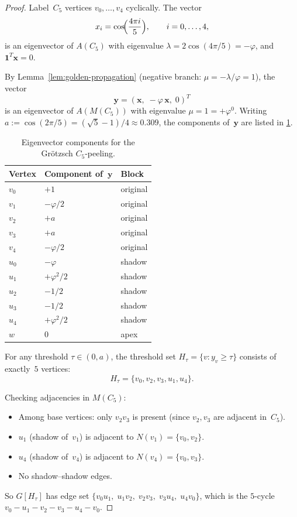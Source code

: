 \documentclass[11pt,a4paper]{amsart}
\theoremstyle{plain}
\theoremstyle{definition}
\theoremstyle{remark}
\newcommand{\vp}{\varphi}
\begin{document}
\begin{proof}
Label~$C_5$ vertices $v_0,\ldots,v_4$ cyclically.  The vector
\[
  x_i = \cos\!\Bigl(\frac{4\pi i}{5}\Bigr),
  \qquad i = 0,\ldots,4,
\]
is an eigenvector of $A(C_5)$ with eigenvalue
$\lambda = 2\cos(4\pi/5) = -\vp$, and $\mathbf{1}^T\mathbf{x} = 0$.

By Lemma~\ref{lem:golden-propagation} (negative branch:
$\mu = -\lambda/\vp = 1$), the vector
\[
  \mathbf{y} = (\mathbf{x},\;-\vp\,\mathbf{x},\;0)^T
\]
is an eigenvector of $A(M(C_5))$ with eigenvalue $\mu = 1 = +\vp^0$.
Writing $a := \cos(2\pi/5) = (\sqrt{5}-1)/4 \approx 0.309$, the components
of~$\mathbf{y}$ are listed in \cref{tab:grotzsch-eig}.

\begin{table}[ht]
\centering
\caption{Eigenvector components for the Gr\"otzsch $C_5$-peeling.}
\label{tab:grotzsch-eig}
\begin{tabular}{lll}
\toprule
Vertex & Component of~$\mathbf{y}$ & Block \\
\midrule
$v_0$ & $+1$        & original \\
$v_1$ & $-\vp/2$    & original \\
$v_2$ & $+a$        & original \\
$v_3$ & $+a$        & original \\
$v_4$ & $-\vp/2$    & original \\
$u_0$ & $-\vp$      & shadow \\
$u_1$ & $+\vp^2/2$  & shadow \\
$u_2$ & $-1/2$      & shadow \\
$u_3$ & $-1/2$      & shadow \\
$u_4$ & $+\vp^2/2$  & shadow \\
$w$   & $0$         & apex \\
\bottomrule
\end{tabular}
\end{table}

For any threshold $\tau \in (0, a)$, the threshold set
$H_\tau = \{v : y_v \geq \tau\}$ consists of exactly~$5$ vertices:
\[
  H_\tau = \{v_0, v_2, v_3, u_1, u_4\}.
\]

Checking adjacencies in $M(C_5)$:
\begin{itemize}
\item Among base vertices: only $v_2 v_3$ is present (since $v_2, v_3$ are
  adjacent in~$C_5$).
\item $u_1$ (shadow of~$v_1$) is adjacent to $N(v_1) = \{v_0, v_2\}$.
\item $u_4$ (shadow of~$v_4$) is adjacent to $N(v_4) = \{v_0, v_3\}$.
\item No shadow--shadow edges.
\end{itemize}

So $G[H_\tau]$ has edge set
$\{v_0 u_1,\;u_1 v_2,\;v_2 v_3,\;v_3 u_4,\;u_4 v_0\}$, which is the
$5$-cycle $v_0 - u_1 - v_2 - v_3 - u_4 - v_0$.
\end{proof}
\end{document}
